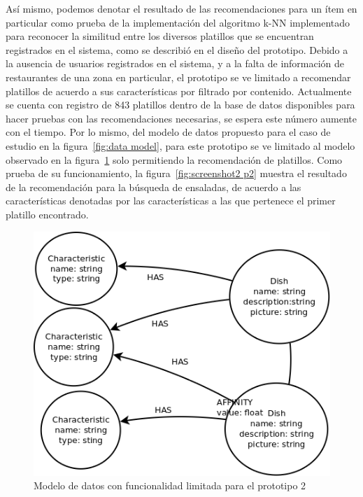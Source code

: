 				Así mismo, podemos denotar el resultado de las recomendaciones para un ítem en particular como prueba de la implementación del algoritmo k-NN implementado para reconocer la similitud entre los diversos platillos que se encuentran registrados en el sistema, como se describió en el diseño del prototipo. Debido a la ausencia de usuarios registrados en el sistema, y a la falta de información de restaurantes de una zona en particular, el prototipo se ve limitado a recomendar platillos de acuerdo a sus características por filtrado por contenido. Actualmente se cuenta con registro de 843 platillos dentro de la base de datos disponibles para hacer pruebas con las recomendaciones necesarias, se espera este número aumente con el tiempo. Por lo mismo, del modelo de datos propuesto para el caso de estudio en la figura~\ref{fig:data model}, para este prototipo se ve limitado al modelo observado en la figura~\ref{fig:p2 db} solo permitiendo la recomendación de platillos. Como prueba de su funcionamiento, la figura~\ref{fig:screenshot2 p2} muestra el resultado de la recomendación para la búsqueda de ensaladas, de acuerdo a las características denotadas por las características a las que pertenece el primer platillo encontrado. 
				
				\begin{figure}[h!]
					\centering
					\includegraphics[width=16cm]{./images/p2_model}
					\caption{Modelo de datos con funcionalidad limitada para el prototipo 2}
					\label{fig:p2 db}
				\end{figure}
				
